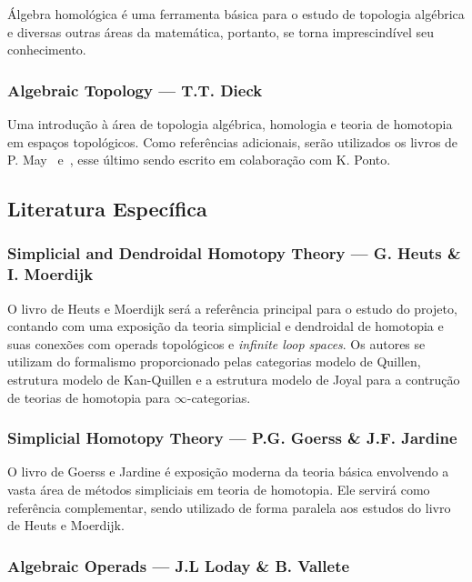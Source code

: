 \documentclass[11pt,reqno]{amsart}
\theoremstyle{definition}
\begin{document}
Álgebra homológica é uma ferramenta básica para o estudo de topologia algébrica
e diversas outras áreas da matemática, portanto, se torna imprescindível seu
conhecimento.

\subsubsection{%
  \textbf{Algebraic Topology} --- T.T. Dieck~\cite{Die08}
}%

Uma introdução à área de topologia algébrica, homologia e teoria de homotopia em
espaços topológicos. Como referências adicionais, serão utilizados os livros de
P. May~\cite{May99Concise} e~\cite{MayPonto12More}, esse último sendo escrito em
colaboração com K. Ponto.

\subsection{Literatura Específica}\label{sub:lit-esp}

\subsubsection{%
  \textbf{Simplicial and Dendroidal Homotopy Theory}
  --- G. Heuts \& I. Moerdijk~\cite{HeuMoer22}
}

O livro de Heuts e Moerdijk será a referência principal para o estudo do
projeto, contando com uma exposição da teoria simplicial e dendroidal de
homotopia e suas conexões com operads topológicos e \textit{infinite loop
spaces}. Os autores se utilizam do formalismo proporcionado pelas categorias
modelo de Quillen, estrutura modelo de Kan-Quillen e a estrutura modelo de Joyal
para a contrução de teorias de homotopia para \(\infty\)-categorias.

\subsubsection{%
  \textbf{Simplicial Homotopy Theory}
  --- P.G. Goerss \& J.F. Jardine~\cite{GoeJar09}
}

O livro de Goerss e Jardine é exposição moderna da teoria básica envolvendo a
vasta área de métodos simpliciais em teoria de homotopia. Ele servirá como
referência complementar, sendo utilizado de forma paralela aos estudos do
livro de Heuts e Moerdijk.

\subsubsection{%
  \textbf{Algebraic Operads}
  --- J.L Loday \& B. Vallete~\cite{LodayVall12}
}
\end{document}
